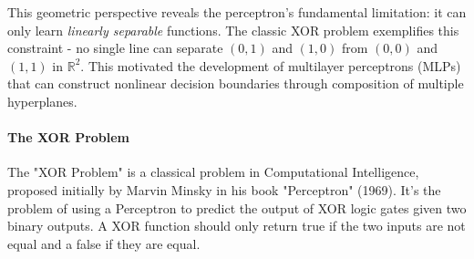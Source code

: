 \documentclass{tufte-handout}
\begin{document}
This geometric perspective reveals the perceptron's fundamental limitation: it can only learn \textit{linearly separable} functions. The classic XOR problem exemplifies this constraint - no single line can separate $(0,1)$ and $(1,0)$ from $(0,0)$ and $(1,1)$ in $\mathbb{R}^2$. This motivated the development of multilayer perceptrons (MLPs) that can construct nonlinear decision boundaries through composition of multiple hyperplanes.

\paragraph{The XOR Problem}

The "XOR Problem" is a classical problem in Computational Intelligence, proposed initially by Marvin Minsky in his book "Perceptron" (1969). It's the problem of using a Perceptron to predict the output of XOR logic gates given two binary outputs. A XOR function should only return true if the two inputs are not equal and a false if they are equal.
\end{document}
